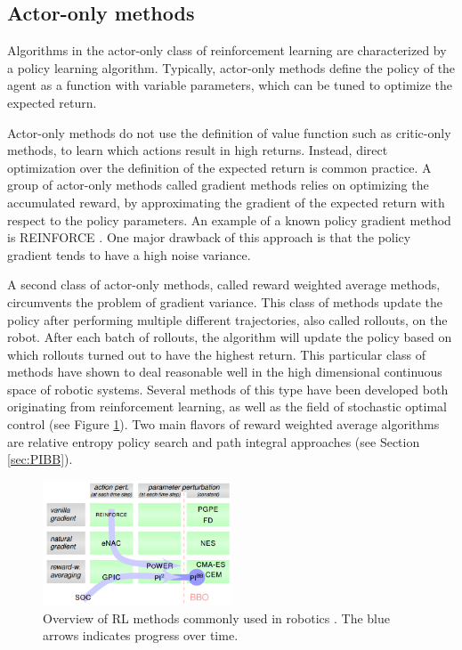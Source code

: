 \documentclass[mscThesis.tex]{subfiles}
\begin{document}
\subsection{Actor-only methods}
Algorithms in the actor-only class of reinforcement learning are characterized by a policy learning algorithm. Typically, actor-only methods define the policy of the agent as a function with variable parameters, which can be tuned to optimize the expected return. 

Actor-only methods do not use the definition of value function such as critic-only methods, to learn which actions result in high returns. Instead, direct optimization over the definition of the expected return is common practice. A group of actor-only methods called gradient methods relies on optimizing the accumulated reward, by approximating the gradient of the expected return with respect to the policy parameters. An example of a known policy gradient method is REINFORCE \cite{williams1992}. One major drawback of this approach is that the policy gradient tends to have a high noise variance.

A second class of actor-only methods, called reward weighted average methods, circumvents the problem of gradient variance. This class of methods update the policy after performing multiple different trajectories, also called rollouts, on the robot. After each batch of rollouts, the algorithm will update the policy based on which rollouts turned out to have the highest return. This particular class of methods have shown to deal reasonable well in the high dimensional continuous space of robotic systems. Several methods of this type have been developed both originating from reinforcement learning, as well as the field of stochastic optimal control (see Figure \ref{fig:actor-critic}). Two main flavors of reward weighted average algorithms are relative entropy policy search \cite{peters2010reps} and path integral approaches \cite{Theodorou2010} (see Section \ref{sec:PIBB}). 
 
\begin{figure}
\centering
\includegraphics[width=0.5\textwidth, keepaspectratio=1]{figures/RLMethods.png}
\caption{Overview of RL methods commonly used in robotics \cite{Stulp2012}. The blue arrows indicates progress over time.}
\label{fig:actor-critic}
\end{figure} 
\end{document}
